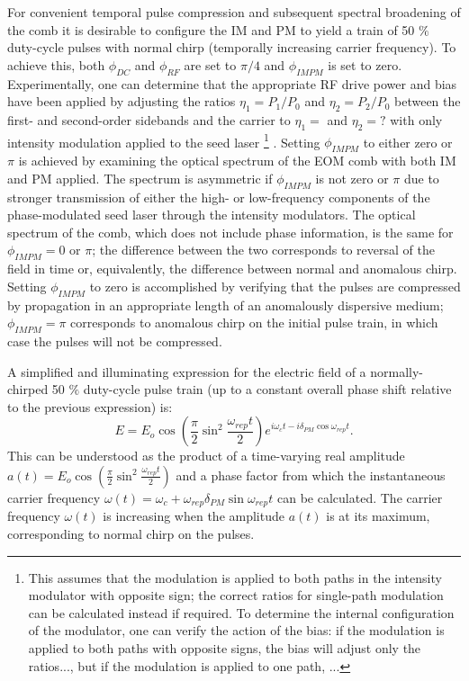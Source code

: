 For convenient temporal pulse compression and subsequent spectral broadening of the comb it is desirable to configure the IM and PM to yield a train of 50 $\%$ duty-cycle pulses with normal chirp (temporally increasing carrier frequency). To achieve this, both $\phi_{DC}$ and $\phi_{RF}$ are set to $\pi/4$ and $\phi_{IMPM}$ is set to zero. Experimentally, one can determine that the appropriate RF drive power and bias have been applied by adjusting the ratios $\eta_1=P_1/P_0$ and $\eta_2=P_2/P_0$ between the first- and second-order sidebands and the carrier to $\eta_1=$ and $\eta_2=?$ with only intensity modulation applied to the seed laser \footnote{This assumes that the modulation is applied to both paths in the intensity modulator with opposite sign; the correct ratios for single-path modulation can be calculated instead if required. To determine the internal configuration of the modulator, one can verify the action of the bias: if the modulation is applied to both paths with opposite signs, the bias will adjust only the ratios..., but if the modulation is applied to one path, ...} . Setting $\phi_{IMPM}$ to either zero or $\pi$ is achieved by examining the optical spectrum of the EOM comb with both IM and PM applied. The spectrum is asymmetric if $\phi_{IMPM}$ is not zero or $\pi$ due to stronger transmission of either the high- or low-frequency components of the phase-modulated seed laser through the intensity modulators. The optical spectrum of the comb, which does not include phase information, is the same for $\phi_{IMPM}=0$ or $\pi$; the difference between the two corresponds to reversal of the field in time or, equivalently, the difference between normal and anomalous chirp. Setting $\phi_{IMPM}$ to zero is accomplished by verifying that the pulses are compressed by propagation in an appropriate length of an anomalously dispersive medium; $\phi_{IMPM}=\pi$ corresponds to anomalous chirp on the initial pulse train, in which case the pulses will not be compressed.

A simplified and illuminating expression for the electric field of a normally-chirped 50 $\%$ duty-cycle pulse train (up to a constant overall phase shift relative to the previous expression) is:
\begin{equation}
E=E_o\cos\left(\frac{\pi}{2}\sin^2{\frac{\omega_{rep}t}{2}}\right)e^{i\omega_ct-i\delta_{PM}\cos{\omega_{rep}t}}. \label{eq:EOMC}
\end{equation}
This can be understood as the product of a time-varying real amplitude $a(t)=E_o\cos\left(\frac{\pi}{2}\sin^2{\frac{\omega_{rep}t}{2}}\right)$ and a phase factor from which the instantaneous carrier frequency $\omega(t)=\omega_c+\omega_{rep}\delta_{PM}\sin{\omega_{rep}t}$ can be calculated. The carrier frequency $\omega(t)$ is increasing when the amplitude $a(t)$ is at its maximum, corresponding to normal chirp on the pulses.


